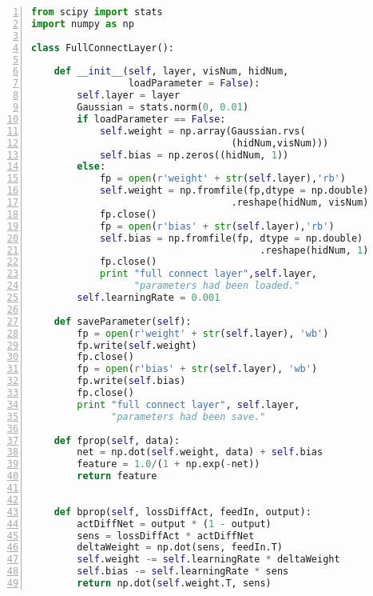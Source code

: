 \newpage

\begin{lstlisting}[language=Python,numbers=left, frame=shadowbox, rulesepcolor=\color{cadegrey}, caption=\text{FullConnectLayer.py}]
from scipy import stats
import numpy as np

class FullConnectLayer():
    
    def __init__(self, layer, visNum, hidNum, 
                 loadParameter = False):
        self.layer = layer
        Gaussian = stats.norm(0, 0.01)
        if loadParameter == False:
            self.weight = np.array(Gaussian.rvs(
                                   (hidNum,visNum)))
            self.bias = np.zeros((hidNum, 1))
        else:
            fp = open(r'weight' + str(self.layer),'rb')
            self.weight = np.fromfile(fp,dtype = np.double)
                                   .reshape(hidNum, visNum)
            fp.close()
            fp = open(r'bias' + str(self.layer),'rb')
            self.bias = np.fromfile(fp, dtype = np.double)
                                        .reshape(hidNum, 1)
            fp.close()
            print "full connect layer",self.layer,
                  "parameters had been loaded."
        self.learningRate = 0.001
    
    def saveParameter(self):
        fp = open(r'weight' + str(self.layer), 'wb')
        fp.write(self.weight)
        fp.close()
        fp = open(r'bias' + str(self.layer), 'wb')
        fp.write(self.bias)
        fp.close()
        print "full connect layer", self.layer,
              "parameters had been save."
    
    def fprop(self, data):
        net = np.dot(self.weight, data) + self.bias
        feature = 1.0/(1 + np.exp(-net))
        return feature
    
    
    def bprop(self, lossDiffAct, feedIn, output):
        actDiffNet = output * (1 - output)
        sens = lossDiffAct * actDiffNet
        deltaWeight = np.dot(sens, feedIn.T) 
        self.weight -= self.learningRate * deltaWeight
        self.bias -= self.learningRate * sens
        return np.dot(self.weight.T, sens)
\end{lstlisting}




